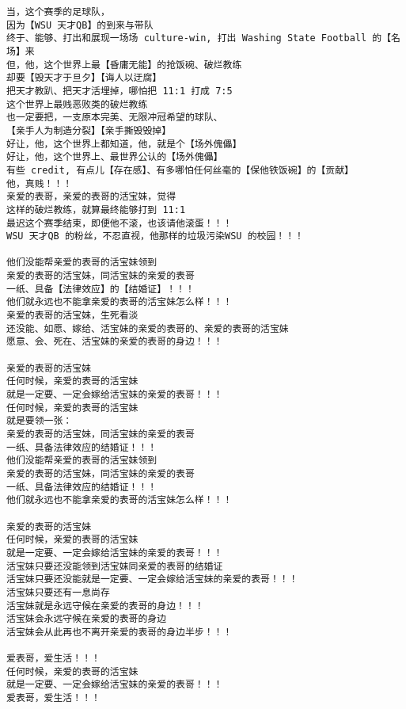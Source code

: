 \documentclass[9pt, b5paper]{article}
\begin{document}
\begin{verbatim}
当，这个赛季的足球队，
因为【WSU 天才QB】的到来与带队
终于、能够、打出和展现一场场 culture-win, 打出 Washing State Football 的【名场】来
但，他，这个世界上最【昏庸无能】的抢饭碗、破烂教练
却要【毁天才于旦夕】【诲人以迂腐】
把天才教趴、把天才活埋掉，哪怕把 11:1 打成 7:5
这个世界上最贱恶败类的破烂教练
也一定要把，一支原本完美、无限冲冠希望的球队、
【亲手人为制造分裂】【亲手撕毁毁掉】
好让，他，这个世界上都知道，他，就是个【场外傀儡】
好让，他，这个世界上、最世界公认的【场外傀儡】
有些 credit, 有点儿【存在感】、有多哪怕任何丝毫的【保他铁饭碗】的【贡献】
他，真贱！！！
亲爱的表哥，亲爱的表哥的活宝妹，觉得
这样的破烂教练，就算最终能够打到 11:1
最迟这个赛季结束，即便他不滚，也该请他滚蛋！！！
WSU 天才QB 的粉丝，不忍直视，他那样的垃圾污染WSU 的校园！！！

他们没能帮亲爱的表哥的活宝妹领到
亲爱的表哥的活宝妹，同活宝妹的亲爱的表哥
一纸、具备【法律效应】的【结婚证】！！！
他们就永远也不能拿亲爱的表哥的活宝妹怎么样！！！
亲爱的表哥的活宝妹，生死看淡
还没能、如愿、嫁给、活宝妹的亲爱的表哥的、亲爱的表哥的活宝妹
愿意、会、死在、活宝妹的亲爱的表哥的身边！！！

亲爱的表哥的活宝妹
任何时候，亲爱的表哥的活宝妹
就是一定要、一定会嫁给活宝妹的亲爱的表哥！！！
任何时候，亲爱的表哥的活宝妹
就是要领一张：
亲爱的表哥的活宝妹，同活宝妹的亲爱的表哥
一纸、具备法律效应的结婚证！！！
他们没能帮亲爱的表哥的活宝妹领到
亲爱的表哥的活宝妹，同活宝妹的亲爱的表哥
一纸、具备法律效应的结婚证！！！
他们就永远也不能拿亲爱的表哥的活宝妹怎么样！！！

亲爱的表哥的活宝妹
任何时候，亲爱的表哥的活宝妹
就是一定要、一定会嫁给活宝妹的亲爱的表哥！！！
活宝妹只要还没能领到活宝妹同亲爱的表哥的结婚证
活宝妹只要还没能就是一定要、一定会嫁给活宝妹的亲爱的表哥！！！
活宝妹只要还有一息尚存
活宝妹就是永远守候在亲爱的表哥的身边！！！
活宝妹会永远守候在亲爱的表哥的身边
活宝妹会从此再也不离开亲爱的表哥的身边半步！！！

爱表哥，爱生活！！！
任何时候，亲爱的表哥的活宝妹
就是一定要、一定会嫁给活宝妹的亲爱的表哥！！！
爱表哥，爱生活！！！
\end{verbatim}
\end{document}

